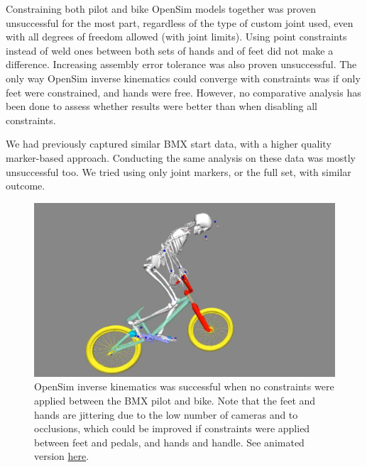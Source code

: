 Constraining both pilot and bike OpenSim models together was proven unsuccessful for the most part, regardless of the type of custom joint used, even with all degrees of freedom allowed (with joint limits). Using point constraints instead of weld ones between both sets of hands and of feet did not make a difference. Increasing assembly error tolerance was also proven unsuccessful. The only way OpenSim inverse kinematics could converge with constraints was if only feet were constrained, and hands were free. However, no comparative analysis has been done to assess whether results were better than when disabling all constraints.

We had previously captured similar BMX start data, with a higher quality marker-based approach. Conducting the same analysis on these data was mostly unsuccessful too. We tried using only joint markers, or the full set, with similar outcome. %

\begin{figure}[hbtp]
	\centering
	\def\svgwidth{1\columnwidth}
	\fontsize{10pt}{10pt}\selectfont
	\includegraphics[width=\linewidth]{"../Chap7/Figures/BMXPilot.png"}
	\caption{OpenSim inverse kinematics was successful when no constraints were applied between the BMX pilot and bike. Note that the feet and hands are jittering due to the low number of cameras and to occlusions, which could be improved if constraints were applied between feet and pedals, and hands and handle. See animated version \href{https://github.com/perfanalytics/pose2sim/blob/main/Content/Activities_verylow.gif}{here}.}
	\label{fig_bmxpilot}
\end{figure}


